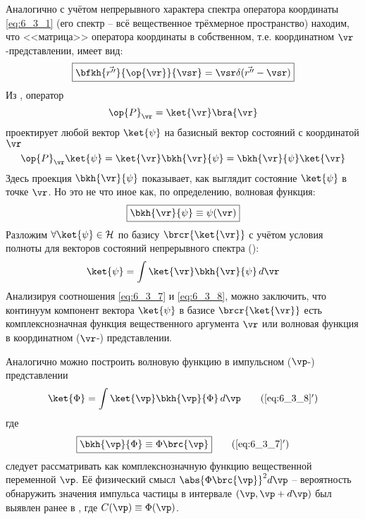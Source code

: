 Аналогично с учётом непрерывного характера спектра оператора координаты \eqref{eq:6_3_1} (его спектр -- всё вещественное трёхмерное пространство) находим, что <<матрица>> оператора координаты в собственном, т.е. координатном $\vr$-представлении, имеет вид:%
\begin{equation}
\label{eq:6_3_4}
\boxed{\bfkh{\vec{r''}}{\op{\vr}}{\vsr}=\vsr \delta(\vec{r''}-\vsr)}
\end{equation}%
%
Из , оператор
\begin{equation}
\label{eq:6_3_5}
\op{P}_{\vr}=\ket{\vr}\bra{\vr}
\end{equation}%
%
проектирует любой вектор $\ket{\psi}$ на базисный вектор состояний с координатой $\vr$
\begin{equation}
\label{eq:6_3_6}
\op{P}_{\vr} \ket{\psi} = \ket{\vr}\bkh{\vr}{\psi} = \bkh{\vr}{\psi} \ket{\vr}
\end{equation}%
%
Здесь проекция $\bkh{\vr}{\psi}$ показывает, как выглядит состояние $\ket{\psi}$ в точке $\vr$. Но это не что иное как, по определению, волновая функция:
\begin{equation}
\label{eq:6_3_7}
\boxed{
	\bkh{\vr}{\psi} \equiv \psi(\vr)
}
\end{equation}%
%
Разложим $\forall \ket{\psi} \in \mathcal{H}$ по базису $\brcr{\ket{\vr}}$ с учётом условия полноты для векторов состояний непрерывного спектра ():
\begin{equation}
\label{eq:6_3_8}
\ket{\psi}=\int \ket{\vr}\bkh{\vr}{\psi} \, d\vr
\end{equation}%
%
Анализируя соотношения \eqref{eq:6_3_7} и \eqref{eq:6_3_8}, можно заключить, что континуум компонент вектора $\ket{\psi}$ в базисе $\brcr{\ket{\vr}}$ есть комплекснозначная функция вещественного аргумента $\vr$ или волновая функция в координатном ($\vr$-) представлении.

Аналогично можно построить волновую функцию в импульсном ($\vp$-) представлении
\begin{equation}
\label{eq:6_3_8_add}
\ket{\Phi}=\int \ket{\vp}\bkh{\vp}{\Phi} \, d\vp
\tag{\ref{eq:6_3_8}$'$}
\end{equation}%
где%
\begin{equation}
\label{eq:6_3_7_add}
\boxed{\bkh{\vp}{\Phi} \equiv \Phi\brc{\vp}}
\tag{\ref{eq:6_3_7}$'$}
\end{equation}%
%
следует рассматривать как комплекснозначную функцию вещественной переменной $\vp$. Её физический смысл $\abs{\Phi\brc{\vp}}^2 d\vp$ -- вероятность обнаружить значения импульса частицы в интервале $(\vp, \vp+d\vp)$ был выявлен ранее в , где $C(\vp) \equiv \Phi(\vp)$.

